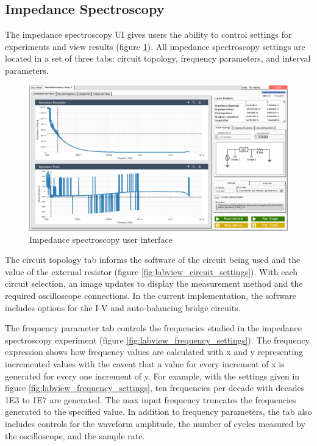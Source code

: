 \FloatBarrier

\subsection{Impedance Spectroscopy}
\par The impedance spectroscopy UI gives users the ability to control settings for experiments and view results (figure \ref{fig:is_gui}). All impedance spectroscopy settings are located in a set of three tabs: circuit topology, frequency parameters, and interval parameters. 

\begin{figure}[h]
    \centering
    \includegraphics[width=\textwidth]{images/IS_gui.png}
    \caption{Impedance spectroscopy user interface}
    \label{fig:is_gui}
\end{figure}

\par The circuit topology tab informs the software of the circuit being used and the value of the external resistor (figure \ref{fig:labview_circuit_settings}). With each circuit selection, an image updates to display the measurement method and the required oscilloscope connections. In the current implementation, the software includes options for the I-V and auto-balancing bridge circuits. 

\par The frequency parameter tab controls the frequencies studied in the impedance spectroscopy experiment (figure \ref{fig:labview_frequency_settings}). The frequency expression shows how frequency values are calculated with x and y representing incremented values with the caveat that a value for every increment of x is generated for every one increment of y. For example, with the settings given in figure \ref{fig:labview_frequency_settings}, ten frequencies per decade with decades 1E3 to 1E7 are generated. The max input frequency truncates the frequencies generated to the specified value. In addition to frequency parameters, the tab also includes controls for the waveform amplitude, the number of cycles measured by the oscilloscope, and the sample rate. 

